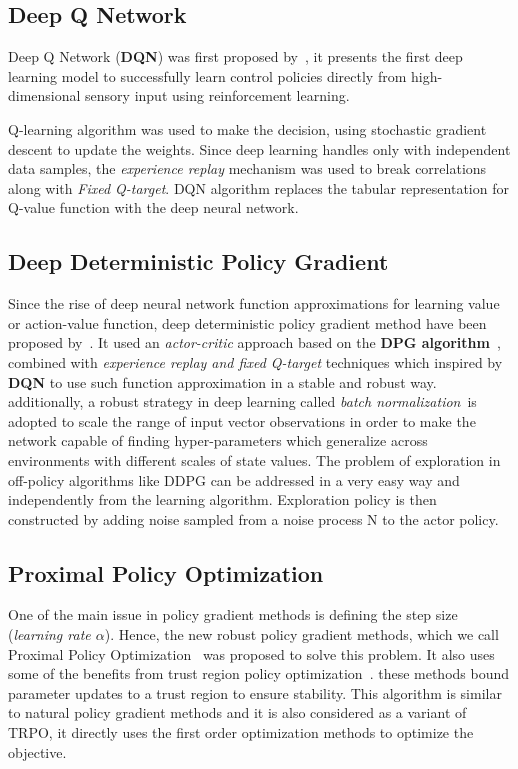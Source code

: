 \subsection{Deep Q Network}
Deep Q Network (\textbf{DQN}) was first proposed by~\parencite{mnih2013playing}, it presents the first deep learning model to successfully learn control policies directly from high-dimensional sensory input using reinforcement learning.

Q-learning algorithm was used to make the decision, using stochastic gradient descent to update the weights. Since deep learning handles only with independent data samples, the \textit{experience replay} mechanism was used to break correlations along with \textit{Fixed Q-target}. DQN algorithm replaces the tabular representation for Q-value function with the deep neural network.

\subsection{Deep Deterministic Policy Gradient}
Since the rise of deep neural network function approximations for learning value or action-value function, deep deterministic policy gradient method have been proposed by~\parencite{lillicrap2015continuous}. It used an \textit{actor-critic} approach based on the \textbf{DPG algorithm}~\parencite{silver2014deterministic}, combined with \textit{experience replay and fixed Q-target} techniques which inspired by \textbf{DQN} to use such function approximation in a stable and robust way. additionally, a robust strategy in deep learning called \textit{batch normalization}~\parencite{ioffe2015batch}is  adopted to scale the range of input vector observations in order to make the network capable of finding hyper-parameters which generalize across environments with different scales of state values.
The problem of exploration in off-policy algorithms like DDPG can be addressed in a very easy way and independently from the learning algorithm. Exploration policy is then constructed by adding noise sampled from a noise process N to the actor policy.

\subsection{Proximal Policy Optimization}
One of the main issue in policy gradient methods is defining the step size (\textit{learning rate $\alpha$}). Hence, the new robust policy gradient methods, which we call Proximal Policy Optimization~\parencite{schulman2017proximal, heess2017emergence} was proposed to solve this problem. It also uses some of the benefits from trust region policy optimization~\parencite{schulman2015trust}. these methods bound parameter updates to a trust region to ensure stability.
This algorithm is similar to natural policy gradient methods and it is also considered as a variant of TRPO, it directly uses the first order optimization methods to optimize the objective.


